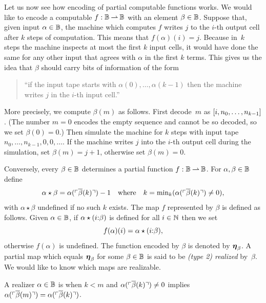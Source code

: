 Let us now see how encoding of partial computable functions works. We
would like to encode a computable $f : \mathbb{B} \mathbin{\rightharpoonup} \mathbb{B}$ with an
element $\beta \in \mathbb{B}$. Suppose that, given input $\alpha \in
\mathbb{B}$, the machine which computes $f$ writes $j$ to the $i$-th
output cell after $k$ steps of computation. This means that
$f(\alpha)(i) = j$. Because in~$k$ steps the machine inspects at most
the first $k$ input cells, it would have done the same for any other
input that agrees with $\alpha$ in the first $k$ terms. This gives us
the idea that $\beta$ should carry bits of information of the form
%
\begin{quote}
  ``if the input tape starts with $\alpha(0), \ldots,
  \alpha(k-1)$ then the machine writes $j$ in the $i$-th input
  cell.''
\end{quote}
%
More precisely, we compute $\beta(m)$ as follows. First decode~$m$ as
$[i, n_0, \ldots, n_{k-1}]$. (The number $m = 0$ encodes the empty
sequence and cannot be so decoded, so we set $\beta(0) = 0$.) Then
simulate the machine for $k$ steps with input tape $n_0, \ldots,
n_{k-1}, 0, 0, \ldots$. If the machine writes $j$ into the $i$-th
output cell during the simulation, set $\beta(m) = j + 1$, otherwise
set $\beta(m) = 0$.

Conversely, every $\beta \in \mathbb{B}$ determines a partial function $f :
\mathbb{B} \mathbin{\rightharpoonup} \mathbb{B}$. For $\alpha, \beta \in \mathbb{B}$ define
%
\begin{equation*}
  \alpha \star \beta = \alpha(\ulcorner \overline{\beta}(k) \urcorner) - 1
  \quad\text{where}\quad
  k = \min\nolimits_k (\alpha(\ulcorner \overline{\beta}(k) \urcorner) \neq 0),
\end{equation*}
%
with $\alpha \star \beta$ undefined if no such $k$ exists. The map $f$
represented by $\beta$ is defined as follows. Given $\alpha \in
\mathbb{B}$, if $\alpha \star
(i {:} \beta)$ is defined for all $i \in \mathbb{N}$ then we set
%
\begin{equation}
  \label{eq:type2-encoding}
  f(\alpha)(i) = \alpha \star (i {:} \beta),
\end{equation}
%
otherwise $f(\alpha)$ is undefined. The function encoded by $\beta$ is
denoted by $\text{\boldmath{$\eta$}}_\beta$. A partial map which equals $\text{\boldmath{$\eta$}}_\beta$ for
some $\beta \in \mathbb{B}$ is said to be \emph{(type 2) realized}
by~$\beta$. We would like to know which maps are realizable.

\begin{definition}
  \label{def:normalized-BB}%
  A realizer $\alpha \in \mathbb{B}$ is  when $k < m$ and
  $\alpha(\ulcorner \overline{\beta}(k) \urcorner) \neq 0$ implies
  $\alpha(\ulcorner \overline{\beta}(m) \urcorner) = \alpha(\ulcorner \overline{\beta}(k) \urcorner)$.
\end{definition}

